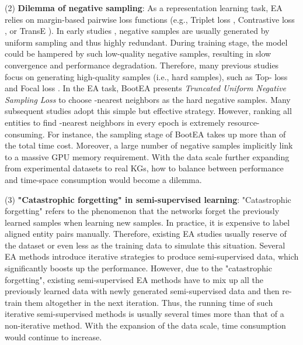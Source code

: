\documentclass[sigconf]{acmart}
\begin{document}
(2) \textbf{Dilemma of negative sampling}:
As a representation learning task, EA relies on margin-based pairwise loss functions (e.g., Triplet loss \cite{DBLP:conf/cvpr/SchroffKP15}, Contrastive loss \cite{DBLP:conf/cvpr/HadsellCL06}, or TransE \cite{DBLP:conf/nips/BordesUGWY13}).
In early studies \cite{DBLP:conf/semweb/SunHL17,DBLP:conf/emnlp/WangLLZ18}, negative samples are usually generated by uniform sampling and thus highly redundant.
During training stage, the model could be hampered by such low-quality negative samples, resulting in slow convergence and performance degradation.
Therefore, many previous studies focus on generating high-quality samples (i.e., hard samples), such as Top- loss \cite{DBLP:conf/nips/FanLYH17} and Focal loss \cite{DBLP:conf/iccv/LinGGHD17}.
In the EA task, BootEA \cite{DBLP:conf/ijcai/SunHZQ18} presents \emph{Truncated Uniform Negative Sampling Loss} to choose -nearest neighbors as the hard negative samples.
Many subsequent studies \cite{DBLP:conf/acl/CaoLLLLC19,DBLP:conf/ijcai/ZhuZ0TG19} adopt this simple but effective strategy.
However, ranking all entities to find -nearest neighbors in every epoch is extremely resource-consuming.
For instance, the sampling stage of BootEA takes up more than  of the total time cost.
Moreover, a large number of negative samples implicitly link to a massive GPU memory requirement.
With the data scale further expanding from experimental datasets to real KGs, how to balance between performance and time-space consumption would become a dilemma.

(3) \textbf{"Catastrophic forgetting" in semi-supervised learning}:
"Catastrophic forgetting" refers to the phenomenon that the networks forget the previously learned samples when learning new samples.
In practice, it is expensive to label aligned entity pairs manually.
Therefore, existing EA studies \cite{DBLP:conf/emnlp/WangLLZ18,DBLP:conf/ijcai/SunHZQ18,DBLP:conf/ijcai/WuLF0Y019} usually reserve  of the dataset or even less as the training data to simulate this situation.
Several EA methods \cite{DBLP:conf/ijcai/SunHZQ18,DBLP:conf/wsdm/MaoWXLW20} introduce iterative strategies to produce semi-supervised data, which significantly boosts up the performance.
However, due to the "catastrophic forgetting", existing semi-supervised EA methods have to mix up all the previously learned data with newly generated semi-supervised data and then re-train them altogether in the next iteration.
Thus, the running time of such iterative semi-supervised methods is usually several times more than that of a non-iterative method. 
With the expansion of the data scale, time consumption would continue to increase.
\end{document}
